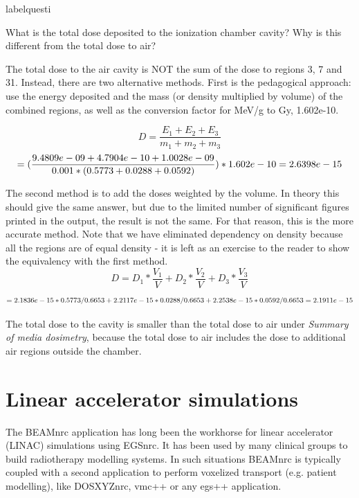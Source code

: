 \documentclass[12pt,twoside]{article}
\makeatletter
\renewcommand\thequesti         {\@arabic\c@questi}
\newenvironment{question}{
    \bfseries
    \edef\@questictr{questi}
    \expandafter
    \list \csname label\@questictr\endcsname {
        \usecounter\@questictr\def\makelabel##1{\hss\llap{##1}}
        \savebox{\questbox}             {\thequesti}
        \setlength\labelsep             {0.6em}
        \setlength\labelwidth           {\wd\questbox}
        \setlength\leftmargini          {\labelwidth}
        \addtolength{\leftmargini}      {\labelsep}
        \addtolength{\leftmargini}      {0.2em}
        \leftmargin\leftmargini
        \setlength\topsep               {1em}
        \setlength\itemsep              {1.2em}
        \setlength\parsep               {0.5em}
    }
}{\normalfont\endlist}
\newenvironment{answer}{\normalfont}{\relax}
\makeatother
\begin{document}
\begin{question}

\item What is the total dose deposited to the ionization chamber cavity? Why is
this different from the total dose to air?

\begin{answer}
The total dose to the air cavity is NOT the sum of the dose to regions 3, 7 and 31.
Instead, there are two alternative methods. First is the pedagogical approach:
use the energy deposited and the mass (or density multiplied by volume) of the combined regions, as well as the conversion factor for MeV/g to Gy, 1.602e-10.

\begin{equation*}
D = \frac{E_1 + E_2 + E_3}{m_1 + m_2 + m_3}
\end{equation*}
\begin{equation*}
= (\frac{9.4809e-09 + 4.7904e-10 + 1.0028e-09}{0.001*(0.5773 + 0.0288 + 0.0592)})*1.602e-10
\\
= 2.6398e-15
\end{equation*}

The second method is to add the doses weighted by the volume. In theory this should give the same answer, but due to the limited number of significant figures printed in the output,
the result is not the same. For that reason, this is the more accurate method. Note that we have eliminated dependency on density because all the regions are of equal density - it is
left as an exercise to the reader to show the equivalency with the first method.
\begin{equation*}
D = D_1 * \frac{V_1}{V} + D_2 * \frac{V_2}{V} + D_3 * \frac{V_3}{V}
\end{equation*}
\begin{equation*}
= 2.1836e-15*0.5773/0.6653 + 2.2117e-15*0.0288/0.6653 + 2.2538e-15*0.0592/0.6653
\\
= 2.1911e-15
\end{equation*}

The total dose to the cavity is smaller than the total dose to air under
\textit{Summary of media dosimetry}, because the total dose to air includes the
dose to additional air regions outside the chamber.
\end{answer}

\end{question}


\clearpage
\section{Linear accelerator simulations}
The BEAMnrc application has long been the workhorse for linear accelerator (LINAC) simulations using EGSnrc. It has been used by many clinical groups to build radiotherapy modelling systems. In such situations BEAMnrc is typically coupled with a second application to perform voxelized transport (e.g. patient modelling), like DOSXYZnrc, vmc++ or any egs++ application.
\end{document}
